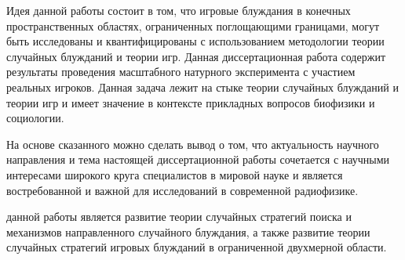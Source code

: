 Идея данной работы состоит в том, что игровые блуждания в конечных пространственных областях, ограниченных поглощающими границами, могут быть исследованы и квантифицированы с использованием методологии теории случайных блужданий и теории игр. Данная диссертационная работа содержит результаты проведения масштабного натурного эксперимента с участием реальных игроков. Данная задача лежит на стыке теории случайных блужданий и теории игр и имеет значение в контексте прикладных вопросов биофизики и социологии.

На основе сказанного можно сделать вывод о том, что актуальность научного направления и тема настоящей диссертационной работы сочетается с научными интересами широкого круга специалистов в мировой науке и является востребованной и важной для исследований в современной радиофизике.


\ifsynopsis
\else
\fi


{\aim} данной работы является развитие теории случайных стратегий поиска и механизмов направленного случайного блуждания, а также развитие теории случайных стратегий игровых блужданий в ограниченной двухмерной области.

